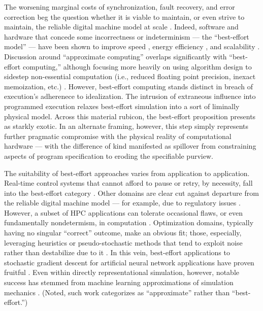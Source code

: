 The worsening marginal costs of synchronization, fault recovery, and error correction beg the question whether it is viable to maintain, or even strive to maintain, the reliable digital machine model at scale \citep{dongarra2014applied}.
Indeed, software and hardware that concede some incorrectness or indeterminism --- the ``best-effort model'' --- have been shown to improve speed \citep{chakrapani2008probabilistic}, energy efficiency \citep{chakrapani2008probabilistic,bocquet2018memory}, and scalability \citep{meng2009best}.
Discussion around ``approximate computing'' overlaps significantly with ``best-effort computing,'' although focusing more heavily on using algorithm design to sidestep non-essential computation (i.e., reduced floating point precision, inexact memoization, etc.) \citep{mittal2016survey}.
However, best-effort computing stands distinct in breach of execution's adherenece to idealization.
The intrusion of extraneous influence into programmed execution relaxes best-effort simulation into a sort of liminally physical model.
Across this material rubicon, the best-effort proposition presents as starkly exotic. 
In an alternate framing, however, this step simply represents further pragmatic compromise with the physical reality of computational hardware --- with the difference of kind manifested as spillover from constraining aspects of program specification to eroding the specifiable purview.

The suitability of best-effort approaches varies from application to application.
Real-time control systems that cannot afford to pause or retry, by necessity, fall into the best-effort category \citep{rahmati2011computing, rhodes2020real}.
Other domains are clear cut against departure from the reliable digital machine model --- for example, due to regulatory issues \citep{dongarra2014applied}.
However, a subset of HPC applications can tolerate occasional flaws, or even fundamentally nondetermism, in computation \citep{chakradhar2010best}.
Optimization domains, typically having no singular ``correct'' outcome, make an obvious fit;
those, especially, leveraging heuristics or pseudo-stochastic methods that tend to exploit noise rather than destabilize due to it \citep{chakrapani2008probabilistic,chakradhar2010best}.
In this vein, best-effort applications to stochastic gradient descent for artificial neural network applications have proven fruitful \citep{dean2012large,zhao2019elastic,niu2011hogwild,noel2014dogwild,rhodes2020real}.
Even within directly representational simulation, however, notable success has stemmed from machine learning approximations of simulation mechanics \citep{behler2007generalizedkochkov2021machine}.
(Noted, such work categorizes as ``approximate'' rather than ``best-effort.'')

